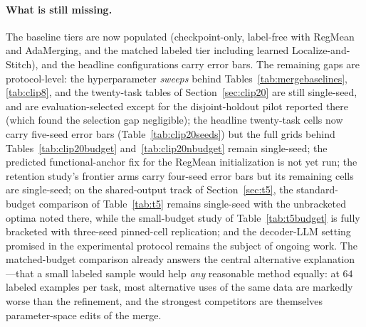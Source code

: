 \documentclass[11pt]{article}
\begin{document}
\paragraph{What is still missing.}
The baseline tiers are now populated (checkpoint-only, label-free with RegMean and AdaMerging, and the matched labeled tier including learned Localize-and-Stitch), and the headline configurations carry error bars. The remaining gaps are protocol-level: the hyperparameter \emph{sweeps} behind Tables~\ref{tab:mergebaselines}, \ref{tab:clip8}, and the twenty-task tables of Section~\ref{sec:clip20} are still single-seed, and are evaluation-selected except for the disjoint-holdout pilot reported there (which found the selection gap negligible); the headline twenty-task cells now carry five-seed error bars (Table~\ref{tab:clip20seeds}) but the full grids behind Tables~\ref{tab:clip20budget} and~\ref{tab:clip20nbudget} remain single-seed; the predicted functional-anchor fix for the RegMean initialization is not yet run; the retention study's frontier arms carry four-seed error bars but its remaining cells are single-seed; on the shared-output track of Section~\ref{sec:t5}, the standard-budget comparison of Table~\ref{tab:t5} remains single-seed with the unbracketed optima noted there, while the small-budget study of Table~\ref{tab:t5budget} is fully bracketed with three-seed pinned-cell replication; and the decoder-LLM setting promised in the experimental protocol remains the subject of ongoing work. The matched-budget comparison already answers the central alternative explanation---that a small labeled sample would help \emph{any} reasonable method equally: at $64$ labeled examples per task, most alternative uses of the same data are markedly worse than the refinement, and the strongest competitors are themselves parameter-space edits of the merge.
\end{document}
